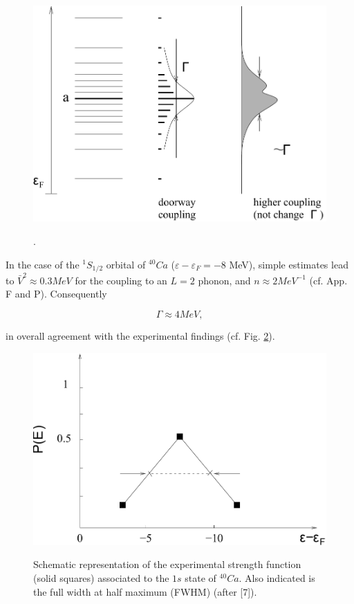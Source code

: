 \documentclass[a4paper,14pt]{book}
\begin{document}
\begin{figure}[h!]
\centerline {
{\includegraphics*[width=\textwidth]{figs_C4S/fig_4_7}}
}
\caption{.}
\label{fig:4.7}
\end{figure}

In the case of the $^1S_{1/2}$ orbital of $^{40}Ca$ ($\varepsilon - \varepsilon_F = -8$ MeV), simple estimates lead to $\bar{V}^2 \approx 0.3 MeV$ for the coupling to an $L=2$ phonon, and $n \approx 2MeV^{-1}$ (cf. App. F and P). Consequently

\begin{equation}
\Gamma \approx 4 MeV ,
\label{eqn:46}
\end{equation}

\noindent in overall agreement with the experimental findings (cf. Fig. \ref{fig:4.8}).

\begin{figure}[h!]
\centerline {
{\includegraphics*[width=\textwidth]{figs_C4S/fig_4_8}}
}
\caption{Schematic representation of the experimental strength function (solid squares) associated to the $1s$ state of $^{40}Ca$. Also indicated is the full width at half maximum (FWHM) (after [7]).}
\label{fig:4.8}
\end{figure}
\end{document}
